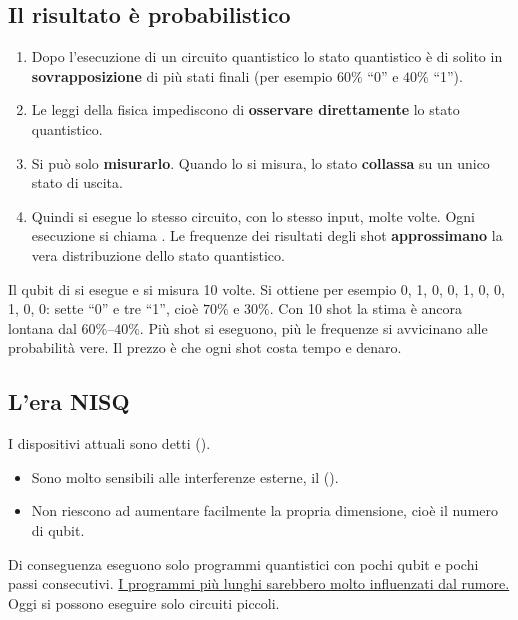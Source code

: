 \subsection{Il risultato è probabilistico}
\label{sec:qse-shot}

\begin{idea}
\begin{enumerate}
  \item Dopo l'esecuzione di un circuito quantistico lo stato quantistico è di solito in \textbf{sovrapposizione} di più
    stati finali (per esempio $60\%$ ``0'' e $40\%$ ``1'').
  \item Le leggi della fisica impediscono di \textbf{osservare direttamente} lo stato quantistico.
  \item Si può solo \textbf{misurarlo}. Quando lo si misura, lo stato \textbf{collassa} su un unico stato di uscita.
  \item Quindi si esegue lo stesso circuito, con lo stesso input, molte volte. Ogni esecuzione si chiama
    . Le frequenze dei risultati degli shot \textbf{approssimano} la vera distribuzione dello stato
    quantistico.
\end{enumerate}
\end{idea}

\begin{esempio}
Il qubit di  si esegue e si misura 10 volte. Si ottiene per esempio 0, 1, 0, 0, 1, 0, 0, 1, 0, 0:
sette ``0'' e tre ``1'', cioè $70\%$ e $30\%$. Con 10 shot la stima è ancora lontana dal $60\%$--$40\%$. Più shot si
eseguono, più le frequenze si avvicinano alle probabilità vere. Il prezzo è che ogni shot costa tempo e denaro.
\end{esempio}

\subsection{L'era NISQ}
\label{sec:qse-nisq}

I dispositivi attuali sono detti  ().
\begin{itemize}
  \item Sono molto sensibili alle interferenze esterne, il  ().
  \item Non riescono ad aumentare facilmente la propria dimensione, cioè il numero di qubit.
\end{itemize}
Di conseguenza eseguono solo programmi quantistici con pochi qubit e pochi passi consecutivi. \uline{I programmi più
lunghi sarebbero molto influenzati dal rumore.} Oggi si possono eseguire solo circuiti piccoli.

